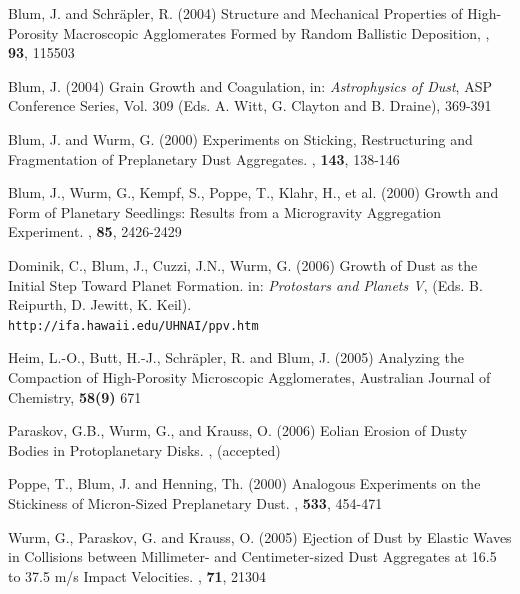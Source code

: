 %
%
%
%
\begin{ownpubl}
\item Blum, J. and Schr\"apler, R. (2004) Structure and Mechanical Properties of
High-Porosity Macroscopic Agglomerates Formed by Random Ballistic Deposition,
\prl, \textbf{93}, 115503

\item Blum, J. (2004) Grain Growth and Coagulation, in: \textit{Astrophysics of Dust},
ASP Conference Series, Vol. 309 (Eds. A. Witt, G. Clayton and B. Draine),
369-391

\item Blum, J. and Wurm, G. (2000) Experiments on Sticking,
Restructuring and Fragmentation of Preplanetary Dust Aggregates.
\ica, \textbf{143}, 138-146

\item Blum, J., Wurm, G., Kempf, S., Poppe, T., Klahr, H., et al.
(2000) Growth and Form of Planetary Seedlings: Results from a
Microgravity Aggregation Experiment. \prl, \textbf{85}, 2426-2429

\item Dominik, C., Blum, J., Cuzzi, J.N., Wurm, G. (2006) Growth of Dust
as the Initial Step Toward Planet Formation. in: \textit{Protostars 
and Planets V}, (Eds. B. Reipurth, D. Jewitt, K. Keil).\\ 
  {\tt http://ifa.hawaii.edu/UHNAI/ppv.htm}

\item Heim, L.-O., Butt, H.-J., Schr\"apler, R. and Blum, J.
(2005) Analyzing the Compaction of High-Porosity Microscopic
Agglomerates, Australian Journal of Chemistry, \textbf{58(9)} 671

\item Paraskov, G.B., Wurm, G., and Krauss, O. (2006) Eolian Erosion of
Dusty Bodies in Protoplanetary Disks. \apj, (accepted)

\item Poppe, T., Blum, J. and Henning, Th. (2000) Analogous
Experiments on the Stickiness of Micron-Sized Preplanetary Dust.
\apj, \textbf{533}, 454-471

\item Wurm, G., Paraskov, G. and Krauss, O. (2005) Ejection of
Dust by Elastic Waves in Collisions between Millimeter- and
Centimeter-sized Dust Aggregates at 16.5 to 37.5 m/s Impact
Velocities. \phre, \textbf{71}, 21304


\end{ownpubl}
